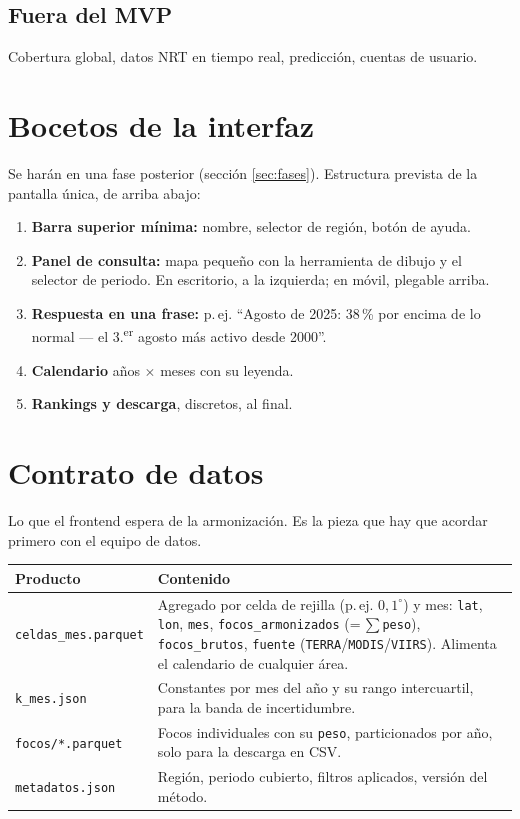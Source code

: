 \documentclass[11pt,a4paper]{article}
\begin{document}
\subsection*{Fuera del MVP}
Cobertura global, datos NRT en tiempo real, predicción, cuentas de usuario.

\section{Bocetos de la interfaz}

Se harán en una fase posterior (sección \ref{sec:fases}). Estructura prevista de
la pantalla única, de arriba abajo:

\begin{enumerate}
  \item \textbf{Barra superior mínima:} nombre, selector de región, botón de ayuda.
  \item \textbf{Panel de consulta:} mapa pequeño con la herramienta de dibujo y el
        selector de periodo. En escritorio, a la izquierda; en móvil, plegable arriba.
  \item \textbf{Respuesta en una frase:} p.\,ej. ``Agosto de 2025: 38\,\% por encima
        de lo normal --- el 3.\textsuperscript{er} agosto más activo desde 2000''.
  \item \textbf{Calendario} años $\times$ meses con su leyenda.
  \item \textbf{Rankings y descarga}, discretos, al final.
\end{enumerate}

\section{Contrato de datos}\label{sec:contrato}

Lo que el frontend espera de la armonización. Es la pieza que hay que acordar primero
con el equipo de datos.

\begin{tabularx}{\linewidth}{@{}lX@{}}
\toprule
Producto & Contenido \\
\midrule
\texttt{celdas\_mes.parquet} & Agregado por celda de rejilla (p.\,ej. $0{,}1^\circ$) y mes:
  \texttt{lat}, \texttt{lon}, \texttt{mes}, \texttt{focos\_armonizados}
  (=\,$\sum$\texttt{peso}), \texttt{focos\_brutos}, \texttt{fuente}
  (\texttt{TERRA}/\texttt{MODIS}/\texttt{VIIRS}). Alimenta el calendario de cualquier área. \\
\texttt{k\_mes.json} & Constantes por mes del año y su rango intercuartil, para la banda
  de incertidumbre. \\
\texttt{focos/*.parquet} & Focos individuales con su \texttt{peso}, particionados por año,
  solo para la descarga en CSV. \\
\texttt{metadatos.json} & Región, periodo cubierto, filtros aplicados, versión del método. \\
\bottomrule
\end{tabularx}
\end{document}
